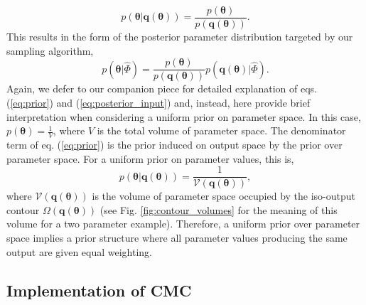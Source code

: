 %
\begin{equation}\label{eq:prior}
p(\boldsymbol{\theta}|\boldsymbol{q}(\boldsymbol{\theta})) = \frac{p(\boldsymbol{\theta})}{p(\boldsymbol{q}(\boldsymbol{\theta}))}.
\end{equation}
%
This results in the form of the posterior parameter distribution targeted by our sampling algorithm,
%
\begin{equation}\label{eq:posterior_input}
p(\boldsymbol{\theta}|\hat{\Phi}) = \frac{p(\boldsymbol{\theta})}{p(\boldsymbol{q}(\boldsymbol{\theta}))} p(\boldsymbol{q}(\boldsymbol{\theta})|\hat{\Phi}).
\end{equation}
%
Again, we defer to our companion piece \cite{lambert2018inverse} for detailed explanation of eqs. (\ref{eq:prior}) and (\ref{eq:posterior_input}) and, instead, here provide brief interpretation when considering a uniform prior on parameter space. In this case, $p(\boldsymbol{\theta}) = \frac{1}{V}$, where $V$ is the total volume of parameter space. The denominator term of eq. (\ref{eq:prior}) is the prior induced on output space by the prior over parameter space. For a uniform prior on parameter values, this is,
%
\begin{equation}\label{eq:contour_volume}
p(\boldsymbol{\theta}|\boldsymbol{q}(\boldsymbol{\theta})) = \frac{1}{\mathcal{V}(\boldsymbol{q}(\boldsymbol{\theta}))},
\end{equation}
%
where $\mathcal{V}(\boldsymbol{q}(\boldsymbol{\theta}))$ is the volume of parameter space occupied by the iso-output contour $\Omega(\boldsymbol{q}(\boldsymbol{\theta}))$ (see Fig. \ref{fig:contour_volumes} for the meaning of this volume for a two parameter example). Therefore, a uniform prior over parameter space implies a prior structure where all parameter values producing the same output are given equal weighting.

\subsection{Implementation of CMC}

